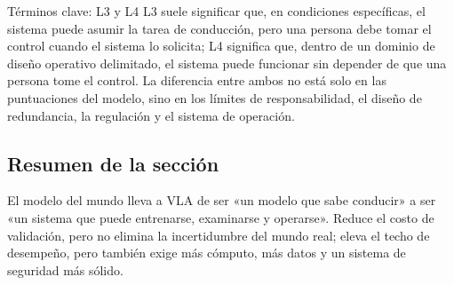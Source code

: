 \begin{knowledgebox}{Términos clave: L3 y L4}
L3 suele significar que, en condiciones específicas, el sistema puede asumir la tarea de conducción, pero una persona debe tomar el control cuando el sistema lo solicita; L4 significa que, dentro de un dominio de diseño operativo delimitado, el sistema puede funcionar sin depender de que una persona tome el control. La diferencia entre ambos no está solo en las puntuaciones del modelo, sino en los límites de responsabilidad, el diseño de redundancia, la regulación y el sistema de operación.
\end{knowledgebox}

\subsection{Resumen de la sección}

El modelo del mundo lleva a VLA de ser «un modelo que sabe conducir» a ser «un sistema que puede entrenarse, examinarse y operarse». Reduce el costo de validación, pero no elimina la incertidumbre del mundo real; eleva el techo de desempeño, pero también exige más cómputo, más datos y un sistema de seguridad más sólido.
